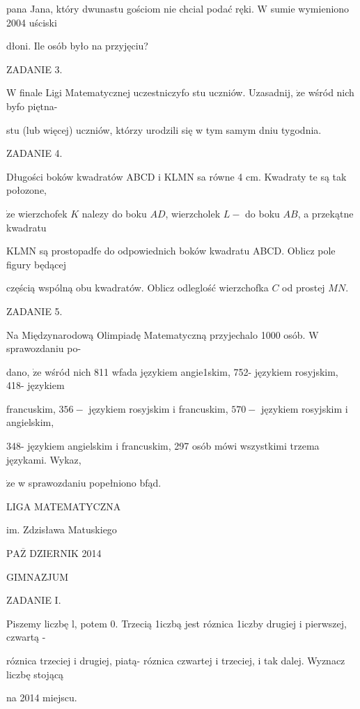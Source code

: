 \documentclass[a4paper,12pt]{article}
\begin{document}
pana Jana, który dwunastu gościom nie chcial podać ręki. $\mathrm{W}$ sumie wymieniono 2004 uściski

dłoni. Ile osób było na przyjęciu?

ZADANIE 3.

$\mathrm{W}$ finale Ligi Matematycznej uczestniczyfo stu uczniów. Uzasadnij, $\dot{\mathrm{z}}\mathrm{e}$ wśród nich byfo piętna-

stu (lub więcej) uczniów, którzy urodzili się w tym samym dniu tygodnia.

ZADANIE 4.

Długości boków kwadratów ABCD $\mathrm{i}$ KLMN sa równe 4 cm. Kwadraty te są tak połozone,

$\dot{\mathrm{z}}\mathrm{e}$ wierzchofek $K$ nalezy do boku $AD$, wierzcholek $L-$ do boku $AB$, a przekątne kwadratu

KLMN są prostopadfe do odpowiednich boków kwadratu ABCD. Oblicz pole figury będącej

częścią wspólną obu kwadratów. Oblicz odleglość wierzchofka $C$ od prostej $MN.$

ZADANIE 5.

Na Międzynarodową Olimpiadę Matematyczną przyjechalo 1000 osób. $\mathrm{W}$ sprawozdaniu po-

dano, $\dot{\mathrm{z}}\mathrm{e}$ wśród nich 811 wfada językiem angie1skim, 752- językiem rosyjskim, 418- językiem

francuskim, $356 -$ językiem rosyjskim i francuskim, $570 -$ językiem rosyjskim i angielskim,

348- językiem angielskim i francuskim, 297 osób mówi wszystkimi trzema językami. Wykaz,

$\dot{\mathrm{z}}\mathrm{e}$ w sprawozdaniu popełniono bfąd.






LIGA MATEMATYCZNA

im. Zdzisława Matuskiego

$\mathrm{P}\mathrm{A}\overline{\mathrm{Z}}$ DZIERNIK 2014

GIMNAZJUM

ZADANIE I.

Piszemy liczbę l, potem 0. Trzecią 1iczbą jest róznica 1iczby drugiej i pierwszej, czwartą -

róznica trzeciej i drugiej, piatą- róznica czwartej i trzeciej, i tak dalej. Wyznacz liczbę stojącą

na 2014 miejscu.
\end{document}
